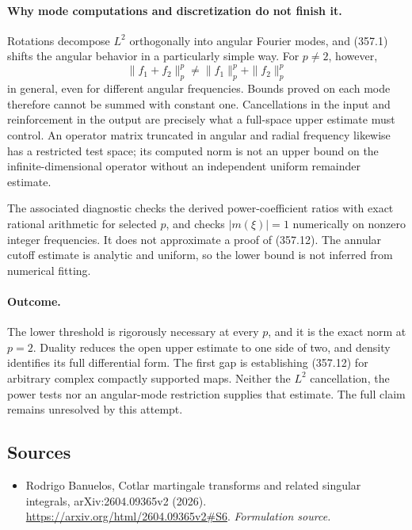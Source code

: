 \documentclass[11pt]{article}
\begin{document}
\paragraph{Why mode computations and discretization do not finish it.}
Rotations decompose $L^2$ orthogonally into angular Fourier modes,
and (357.1) shifts the angular behavior in a particularly simple way.
For $p\ne2$, however,
\[
 \|f_1+f_2\|_p^p\ne\|f_1\|_p^p+\|f_2\|_p^p
\]
in general, even for different angular frequencies. Bounds proved on
each mode therefore cannot be summed with constant one. Cancellations
in the input and reinforcement in the output are precisely what a
full-space upper estimate must control. An operator matrix truncated
in angular and radial frequency likewise has a restricted test space;
its computed norm is not an upper bound on the infinite-dimensional
operator without an independent uniform remainder estimate.

The associated diagnostic checks the derived power-coefficient ratios
with exact rational arithmetic for selected $p$, and checks
$|m(\xi)|=1$ numerically on nonzero integer frequencies. It does not approximate
a proof of (357.12). The annular cutoff estimate is analytic and
uniform, so the lower bound is not inferred from numerical fitting.

\paragraph{Outcome.}
The lower threshold is rigorously necessary at every $p$, and it is
the exact norm at $p=2$. Duality reduces the open upper estimate to
one side of two, and density identifies its full differential form.
The first gap is establishing (357.12) for arbitrary complex compactly
supported maps. Neither the $L^2$ cancellation, the power tests nor
an angular-mode restriction supplies that estimate. The full claim
remains unresolved by this attempt.
\subsection{Sources}
\begin{itemize}
\item[S1]Rodrigo Banuelos, Cotlar martingale transforms and related singular integrals, arXiv:2604.09365v2 (2026).
\url{https://arxiv.org/html/2604.09365v2#S6}.
\textit{Formulation source.}
\end{itemize}
\end{document}
